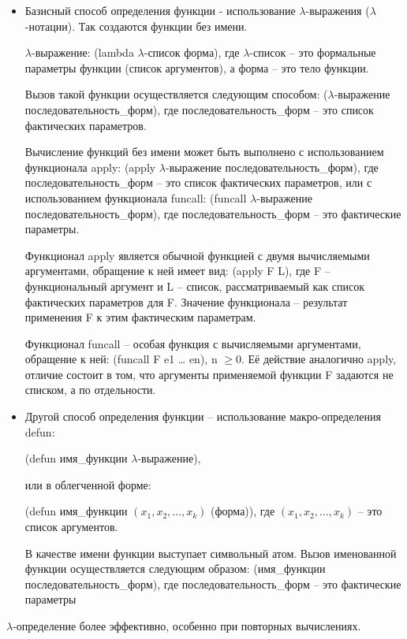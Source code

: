\documentclass[12pt]{report}
\begin{document}
\begin{itemize}
	\item Базисный способ  определения  функции - использование $\lambda$-выражения ($\lambda$-нотации). Так создаются функции без имени.
	
	$\lambda$-выражение: (lambda $\lambda$-список форма), 
	где $\lambda$-список --  это формальные параметры функции (список аргументов), а форма -- это тело функции.
	
	Вызов такой функции осуществляется следующим способом: ($\lambda$-выражение последовательность\_форм), 
	где последовательность\_форм -- это список фактических параметров.
	
	Вычисление функций без имени может быть выполнено с использованием функционала apply: (apply $\lambda$-выражение последовательность\_форм), где последовательность\_форм -- это список фактических параметров, или с использованием функционала funcall: (funcall $\lambda$-выражение последовательность\_форм), где последовательность\_форм -- это фактические параметры.
	
	Функционал apply является обычной функцией с двумя  вычисляемыми аргументами, обращение к ней имеет вид: (apply F L), где F – функциональный аргумент и L -- список, рассматриваемый как список фактических параметров для F. Значение функционала -- результат применения F к этим фактическим параметрам.
	
	Функционал funcall – особая функция с вычисляемыми аргументами, обращение к ней: (funcall F e1 … en), n $\geqslant 0$. Её   действие аналогично apply, отличие состоит в том, что аргументы  применяемой функции F задаются не списком, а по отдельности. 
	
	\item Другой способ определения функции -- использование макро-определения defun: 
	
	(defun имя\_функции $\lambda$-выражение), 
	
	или  в облегченной форме:
	
	(defun имя\_функции $(x_1, x_2, ..., x_k)$ (форма)), 
	где $(x_1, x_2, ..., x_k)$ -- это  список аргументов.
	
	В качестве имени функции выступает символьный атом. 
	Вызов именованной функции осуществляется следующим образом: (имя\_функции последовательность\_форм), 
	где последовательность\_форм -- это фактические параметры
	
\end{itemize}

$\lambda$-определение более эффективно, особенно при повторных вычислениях. 
\end{document}

